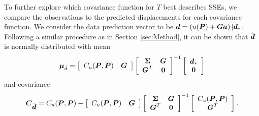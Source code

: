 \documentclass[extra,mreferee]{gji}
\begin{document}
To further explore which covariance function for $T$ best describes
SSEs, we compare the observations to the predicted displacements for
each covariance function. We consider the data prediction vector to be
$\hat{\data} = \left(u(\points) + \G\mitbf{a}\right)|\data_*$.
Following a similar procedure as in Section \ref{sec:Method}, it can
be shown that $\hat{\data}$ is normally distributed with mean
\begin{equation}\label{eq:DataPredMean}
\mitbf{\mu}_{\hat{d}} = \left[\begin{array}{cc}
                           C_u(\points,\points) & \G \\
                           \end{array}\right]
                     \left[\begin{array}{cc}
                           \mitbf{\Sigma} & \G \\
                           \G^T  & \zeros \\
                           \end{array}\right]^{-1}
                     \left[\begin{array}{c}
                           \data_* \\
                           \zeros \\
                           \end{array}\right]
\end{equation}  
and covariance
\begin{equation}\label{eq:DataPredCov}
\mitbf{C}_{\hat{\data}} = C_u(\points,\points) - 
                        \left[\begin{array}{cc}
                              C_u(\points,\points) & \G \\
                              \end{array}\right]
                        \left[\begin{array}{cc}
                              \mitbf{\Sigma} & \G \\
                              \G^T  & \zeros \\
                              \end{array}\right]^{-1}
                        \left[\begin{array}{c}
                              C_u(\points,\points) \\
                              \G^T \\
                              \end{array}\right].
\end{equation}
\end{document}
